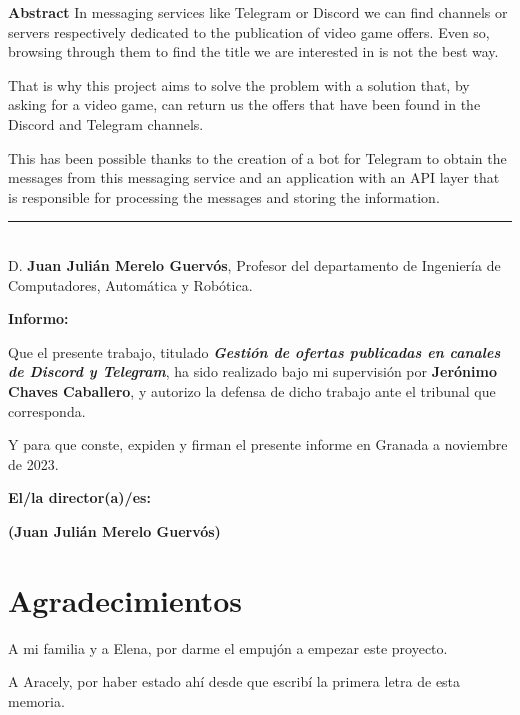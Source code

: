 \noindent\textbf{Abstract}
In messaging services like Telegram or Discord we can find channels or servers 
respectively dedicated to the publication of video game offers. Even so, browsing 
through them to find the title we are interested in is not the best way.

That is why this project aims to solve the problem with a solution that, by asking
for a video game, can return us the offers that have been found in the Discord and
Telegram channels.

This has been possible thanks to the creation of a bot for Telegram to obtain the
messages from this messaging service and an application with an API layer that is
responsible for processing the messages and storing the information.

\cleardoublepage

\thispagestyle{empty}

\noindent\rule[-1ex]{\textwidth}{2pt}\\[4.5ex]

D. \textbf{Juan Julián Merelo Guervós}, Profesor del  departamento de Ingeniería de Computadores, Automática y Robótica.

\vspace{0.5cm}

\textbf{Informo:}

\vspace{0.5cm}

Que el presente trabajo, titulado \textit{\textbf{Gestión de ofertas publicadas en canales de Discord y Telegram}},
ha sido realizado bajo mi supervisión por \textbf{Jerónimo Chaves Caballero}, y autorizo la defensa de dicho trabajo ante el tribunal
que corresponda.

\vspace{0.5cm}

Y para que conste, expiden y firman el presente informe en Granada a noviembre de 2023.

\vspace{1cm}

\textbf{El/la director(a)/es: }

\vspace{5cm}

\noindent \textbf{(Juan Julián Merelo Guervós)}

\chapter*{Agradecimientos}

A mi familia y a Elena, por darme el empujón a empezar este proyecto.

A Aracely, por haber estado ahí desde que escribí la primera letra de esta memoria.
